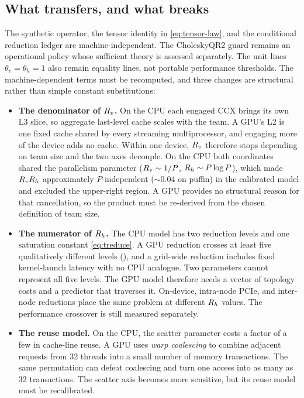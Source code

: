 \subsection{What transfers, and what breaks}

The synthetic operator, the tensor identity in \eqref{eq:tensor-law}, and the conditional reduction ledger are machine-independent. The CholeskyQR2 guard remains an operational policy whose sufficient theory is assessed separately. The unit lines $\theta_v=\theta_h=1$ also remain equality lines, not portable performance thresholds. The machine-dependent terms must be recomputed, and three changes are structural rather than simple constant substitutions:

\begin{itemize}
\item \textbf{The denominator of $R_v$.} On the CPU each engaged CCX brings its own L3 slice, so aggregate last-level cache scales with the team. A GPU's L2 is one fixed cache shared by every streaming multiprocessor, and engaging more of the device adds no cache. Within one device, $R_v$ therefore stops depending on team size and the two axes decouple. On the CPU both coordinates shared the parallelism parameter ($R_v \sim 1/P$, $R_h \sim P\log P$), which made $R_v R_h$ approximately $P$-independent (${\sim}0.04$ on puffin) in the calibrated model and excluded the upper-right region. A GPU provides no structural reason for that cancellation, so the product must be re-derived from the chosen definition of team size.

\item \textbf{The numerator of $R_h$.} The CPU model has two reduction levels and one saturation constant \eqref{eq:treduce}. A GPU reduction crosses at least five qualitatively different levels (), and a grid-wide reduction includes fixed kernel-launch latency with no CPU analogue. Two parameters cannot represent all five levels. The GPU model therefore needs a vector of topology costs and a predictor that traverses it. On-device, intra-node PCIe, and inter-node reductions place the same problem at different $R_h$ values. The performance crossover is still measured separately.

\item \textbf{The reuse model.} On the CPU, the scatter parameter costs a factor of a few in cache-line reuse. A GPU uses \emph{warp coalescing} to combine adjacent requests from 32 threads into a small number of memory transactions. The same permutation can defeat coalescing and turn one access into as many as 32 transactions. The scatter axis becomes more sensitive, but its reuse model must be recalibrated.
\end{itemize}

